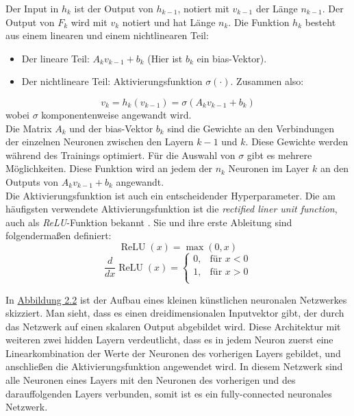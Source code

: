 Der Input in $h_k$ ist der Output von $h_{k-1}$, notiert mit $v_{k-1}$ der L\"ange $n_{k-1}$. Der Output von $F_k$ wird mit $v_k$ notiert und hat L\"ange $n_k$. 
Die Funktion $h_k$ besteht aus einem linearen und einem nichtlinearen Teil:

\begin{itemize}
  \item Der lineare Teil: $A_k v_{k-1} + b_k$ (Hier ist $b_k$ ein bias-Vektor).
  \item Der nichtlineare Teil: Aktivierungsfunktion $\sigma(\cdot)$. Zusammen also:
\end{itemize}
$$ v_k = h_k(v_{k-1}) = \sigma(A_k v_{k-1} + b_k) $$
wobei $\sigma$ komponentenweise angewandt wird.\\

Die Matrix $A_k$ und der bias-Vektor $b_k$ sind die Gewichte an den Verbindungen der einzelnen Neuronen zwischen den Layern $k-1$ und $k$. 
Diese Gewichte werden w\"ahrend des Trainings optimiert. F\"ur die Auswahl von $\sigma$ gibt es mehrere M\"oglichkeiten. Diese Funktion wird an jedem der
$n_k$ Neuronen im Layer $k$ an den Outputs von $A_k v_{k-1} + b_k$ angewandt. \\

Die Aktivierungsfunktion ist auch ein entscheidender Hyperparameter. Die am h\"aufigsten verwendete Aktivierungsfunktion ist die \textit{rectified liner unit function},
auch als \textit{ReLU}-Funktion bekannt \cite{activation}. Sie und ihre erste Ableitung sind folgenderma{\ss}en definiert:
$$ \operatorname{ReLU}(x) = \max(0,x)$$
$$ \frac{d}{dx}\operatorname{ReLU}(x) =
    \left\{
    \begin{array}{lr}
      0,& \text{für }x < 0 \\
      1,& \text{für }x > 0 \\
    \end{array}
    \right. 
$$


In \hyperref[fig:nn]{Abbildung 2.2} ist der Aufbau eines kleinen k\"unstlichen neuronalen Netzwerkes skizziert. Man sieht, dass es einen dreidimensionalen Inputvektor gibt, der
durch das Netzwerk auf einen skalaren Output abgebildet wird. Diese Architektur mit weiteren zwei hidden Layern verdeutlicht, dass es in jedem Neuron zuerst eine Linearkombination der 
Werte der Neuronen des vorherigen Layers gebildet, und anschlie{\ss}en die Aktivierungsfunktion angewendet wird. In diesem Netzwerk sind alle Neuronen eines Layers mit den Neuronen 
des vorherigen und des darauffolgenden Layers verbunden, somit ist es ein fully-connected neuronales Netzwerk. \\


